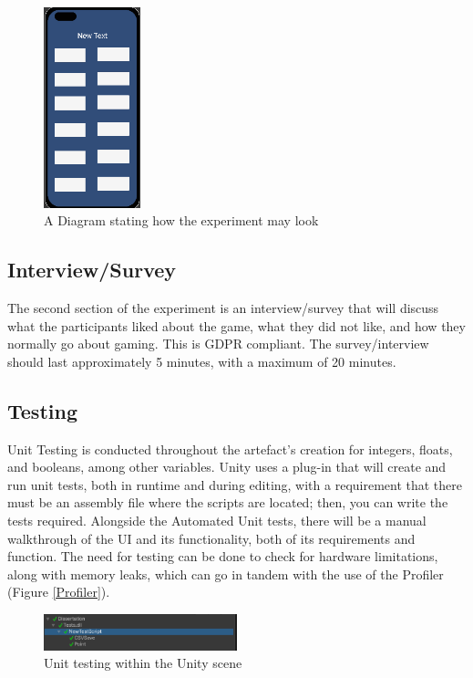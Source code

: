 \documentclass[conference]{IEEEtran}
\begin{document}
\begin{figure}[H]
\begin{center}
\includegraphics[width = 0.25\textwidth, ]{Sim1}
\caption{A Diagram stating how the experiment may look}
\label{figure1}
\end{center}
\end{figure}

\subsection{Interview/Survey}
The second section of the experiment is an interview/survey that will discuss what the participants liked about the game, what they did not like, and how they normally go about gaming. This is GDPR compliant. The survey/interview should last approximately 5 minutes, with a maximum of 20 minutes.

\subsection{Testing}
Unit Testing is conducted throughout the artefact’s creation for integers, floats, and booleans, among other variables. Unity uses a plug-in that will create and run unit tests, both in runtime and during editing, with a requirement that there must be an assembly file where the scripts are located; then, you can write the tests required. Alongside the Automated Unit tests, there will be a manual walkthrough of the UI and its functionality, both of its requirements and function. The need for testing can be done to check for hardware limitations, along with memory leaks, which can go in tandem with the use of the Profiler (Figure \ref{Profiler}).
\begin{figure}[H]
\begin{center}
\includegraphics[width = 0.5\textwidth, ]{Unittesting}
\caption{Unit testing within the Unity scene}
\label{figure3}
\end{center}
\end{figure}
\end{document}
